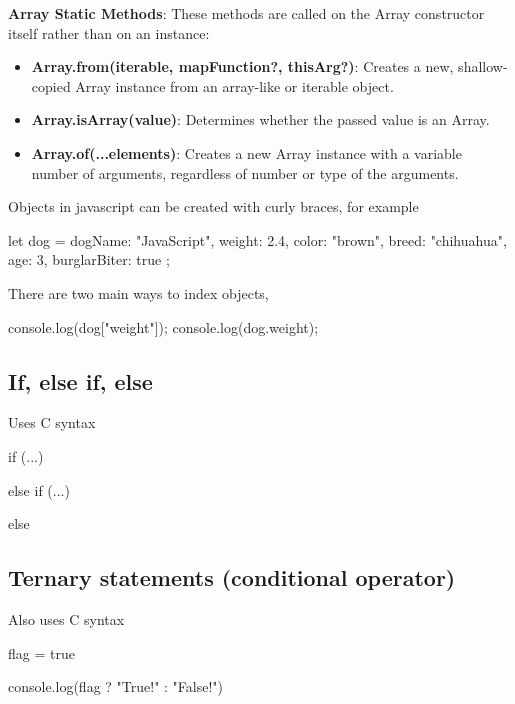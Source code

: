 \documentclass{report}
\begin{document}
    \bigbreak \noindent 
    \textbf{Array Static Methods}: These methods are called on the Array constructor itself rather than on an instance:
    \begin{itemize}
        \item \textbf{Array.from(iterable, mapFunction?, thisArg?)}: Creates a new, shallow-copied Array instance from an array-like or iterable object.
        \item \textbf{Array.isArray(value)}: Determines whether the passed value is an Array.
        \item \textbf{Array.of(...elements)}: Creates a new Array instance with a variable number of arguments, regardless of number or type of the arguments.
    \end{itemize}

    \pagebreak 

    \pagebreak 
    \bigbreak \noindent 
    Objects in javascript can be created with curly braces, for example
    \bigbreak \noindent 
    \begin{jscode}
        let dog = { dogName: "JavaScript",
            weight: 2.4,
            color: "brown",
            breed: "chihuahua",
            age: 3,
            burglarBiter: true
        };
    \end{jscode}
    \bigbreak \noindent 
    There are two main ways to index objects,
    \bigbreak \noindent 
    \begin{jscode}
        console.log(dog["weight"]);
        console.log(dog.weight);
    \end{jscode}

    \pagebreak 
    \bigbreak \noindent 
    \subsection{If, else if, else}
    \bigbreak \noindent 
    Uses C syntax
    \bigbreak \noindent 
    \begin{jscode}
        if (...) {

        } else if (...) {

        } else {

        }
    \end{jscode}

    \bigbreak \noindent 
    \subsection{Ternary statements (conditional operator)}
    \bigbreak \noindent 
    Also uses C syntax
    \bigbreak \noindent 
    \begin{jscode}
    flag = true

    console.log(flag ? "True!" : "False!")
    \end{jscode}
\end{document}
